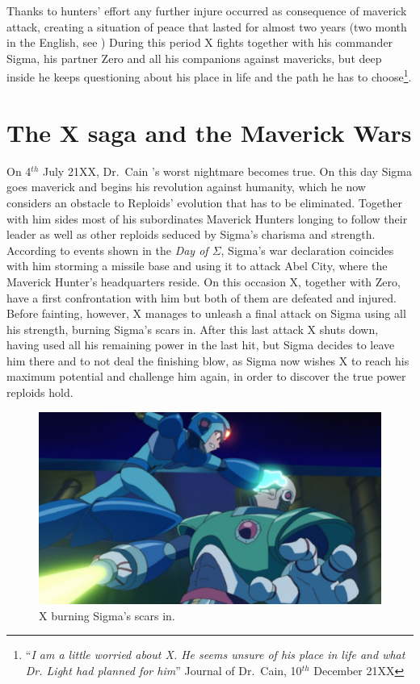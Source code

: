 Thanks to hunters' effort any further injure occurred as consequence of maverick attack, creating a situation of peace that lasted  for almost two years (two month in the English, see \PtIIWarning) During this period X fights together with his commander Sigma, his partner Zero and all his companions against mavericks, but deep inside he keeps questioning about his place in life and the path he has to choose\footnote{``\textit{I am a little worried about X. He seems unsure of his place in life and what Dr. Light had planned for him}'' Journal of Dr.~Cain, 10$^{th}$ December 21XX}.

\section{The X saga and the Maverick Wars}
On 4$^{th}$ July 21XX, Dr.~Cain 's worst nightmare becomes true. On this day Sigma goes maverick and begins his revolution against humanity, which he now considers an obstacle to Reploids' evolution that has to be eliminated. Together with him sides most of his subordinates Maverick Hunters longing to follow their leader as well as other reploids seduced by Sigma's charisma and strength. According to events shown in the \textit{Day of $\Sigma$}, Sigma's war declaration coincides with him storming a missile base and using it to attack Abel City, where the Maverick Hunter's headquarters reside. On this occasion X, together with Zero, have a first confrontation with him but both of them are defeated and injured. Before fainting, however, X manages to unleash a final attack on Sigma using all his strength, burning Sigma's scars in. After this last attack X shuts down, having used all his remaining power in the last hit, but Sigma decides to leave him there and to not deal the finishing blow, as Sigma now wishes X to reach his maximum potential and challenge him again, in order to discover the true power reploids hold.
\begin{figure}[htp]
	\centering
	\includegraphics[width=.5\linewidth]{figures/X1/Sigma_scar.jpg}
	\caption{X burning Sigma's scars in.}
\end{figure}


